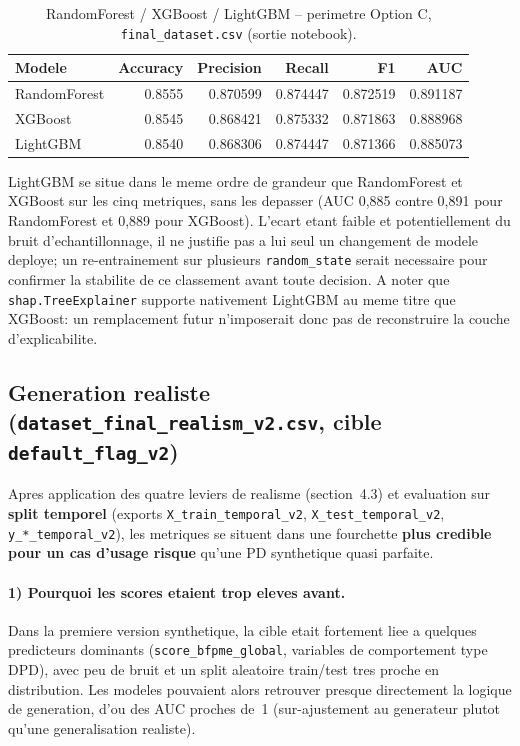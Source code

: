 \documentclass[11pt,a4paper]{article}
\begin{document}
\begin{table}[h]
  \centering
  \caption{RandomForest / XGBoost / LightGBM -- perimetre Option C, \texttt{final\_dataset.csv} (sortie notebook).}
  \label{tab:lightgbm_v1}
  \begin{tabular}{lrrrrr}
    \toprule
    Modele & Accuracy & Precision & Recall & F1 & AUC \\
    \midrule
    RandomForest & 0.8555 & 0.870599 & 0.874447 & 0.872519 & 0.891187 \\
    XGBoost      & 0.8545 & 0.868421 & 0.875332 & 0.871863 & 0.888968 \\
    LightGBM     & 0.8540 & 0.868306 & 0.874447 & 0.871366 & 0.885073 \\
    \bottomrule
  \end{tabular}
\end{table}

LightGBM se situe dans le meme ordre de grandeur que RandomForest et XGBoost sur les cinq
metriques, sans les depasser (AUC 0,885 contre 0,891 pour RandomForest et 0,889 pour XGBoost).
L'ecart etant faible et potentiellement du bruit d'echantillonnage, il ne justifie pas a lui
seul un changement de modele deploye; un re-entrainement sur plusieurs \texttt{random\_state}
serait necessaire pour confirmer la stabilite de ce classement avant toute decision. A noter que
\texttt{shap.TreeExplainer} supporte nativement LightGBM au meme titre que XGBoost: un
remplacement futur n'imposerait donc pas de reconstruire la couche d'explicabilite.

\subsection{Generation realiste (\texttt{dataset\_final\_realism\_v2.csv}, cible \texttt{default\_flag\_v2})}

Apres application des quatre leviers de realisme (section~4.3) et evaluation sur \textbf{split temporel} (exports \texttt{X\_train\_temporal\_v2}, \texttt{X\_test\_temporal\_v2}, \texttt{y\_*\_temporal\_v2}), les metriques se situent dans une fourchette \textbf{plus credible pour un cas d'usage risque} qu'une PD synthetique quasi parfaite.

\paragraph{1) Pourquoi les scores etaient trop eleves avant.}
Dans la premiere version synthetique, la cible etait fortement liee a quelques predicteurs dominants (\texttt{score\_bfpme\_global}, variables de comportement type DPD), avec peu de bruit et un split aleatoire train/test tres proche en distribution. Les modeles pouvaient alors retrouver presque directement la logique de generation, d'ou des AUC proches de~1 (sur-ajustement au generateur plutot qu'une generalisation realiste).
\end{document}
